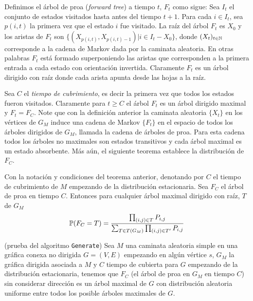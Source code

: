 Definimos el árbol de proa (\textit{forward tree}) a tiempo $t$, $F_{t}$ como sigue: Sea $I_{t}$ el conjunto de estados visitados hasta antes del tiempo $t+1$. Para cada $i\in I_{t}$, sea $p(i,t)$ la primera vez que el estado $i$ fue visitado. La raíz del árbol $F_{t}$ es $X_{0}$ y los aristas de $F_{t}$ son $\{(X_{p(i,t)},X_{p(i,t)-1}) | i\in I_{t}-X_{0}\}$, donde $(X_{t})_{t\in \N}$ corresponde a la cadena de Markov dada por la caminata aleatoria. En otras palabras $F_{t}$ está formado superponiendo las aristas que corresponden a la primera entrada a cada estado con orientación invertida. Claramente $F_{t}$ es un árbol dirigido con raíz donde cada arista apunta desde las hojas a la raíz.

Sea $C$ el \textit{tiempo de cubrimiento}, es decir la primera vez que todos los estados fueron visitados. Claramente para $t\geq C$ el árbol $F_{t}$ es un árbol dirigido maximal y $F_{t}=F_{C}$. Note que con la definición anterior la caminata aleatoria $\{X_{t}\}$ en los vértices de $G_{M}$ induce una cadena de Markov $\{F_{t}\}$ en el espacio de todos los árboles dirigidos de $G_{M}$, llamada la cadena de árboles de proa. Para esta cadena todos los árboles no maximales son estados transitivos y cada árbol maximal es un estado absorbente. Más aún, el siguiente teorema establece la distribución de $F_{C}$.

\begin{teo}
Con la notación y condiciones del teorema anterior, denotando por $C$ el tiempo de cubrimiento de $M$ empezando de la distribución estacionaria. Sea $F_{C}$ el árbol de proa en tiempo $C$. Entonces para cualquier árbol maximal dirigido con raíz, $T$ de $G_{M}$
$$\P(F_{C} = T) = \frac{\prod_{(i,j)\in T} P_{i,j}}{\sum_{T\in T(G_{M})} \prod_{(i,j)\in T'} P_{i,j}}$$
\end{teo}

\begin{coro}
(prueba del algoritmo \texttt{Generate}) Sea $M$ una caminata aleatoria simple en una gráfica conexa no dirigida $G = (V, E)$ empezando en algún vértice $s$, $G_{M}$ la gráfica dirigida asociada a $M$ y $C$ tiempo de cubierta para $G$ empezando de la distribución estacionaria, tenemos que $F_{C}$ (el árbol de proa en $G_{M}$ en tiempo $C$) sin considerar dirección es un árbol maximal de $G$ con distribución aleatoria uniforme entre todos los posible árboles maximales de $G$.
\end{coro}


